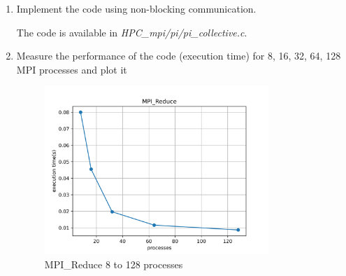 \documentclass[12pt]{article}
\begin{document}
\begin{enumerate}
  
  \item Implement the code using non-blocking communication.
    
  The code is available in \textit{HPC\_mpi/pi/pi\_collective.c}.
  \item  Measure the performance of the code (execution time) for 8, 16, 32,  64, 128 MPI processes and plot it
   
  \begin{figure}[H]
    \centering
    \includegraphics[width=0.8\textwidth]{graph-pi-mpi-reduce.png}
    \caption{MPI\_Reduce 8 to 128 processes}
    \label{fig:blocking}
  \end{figure}
\end{enumerate}
\end{document}
